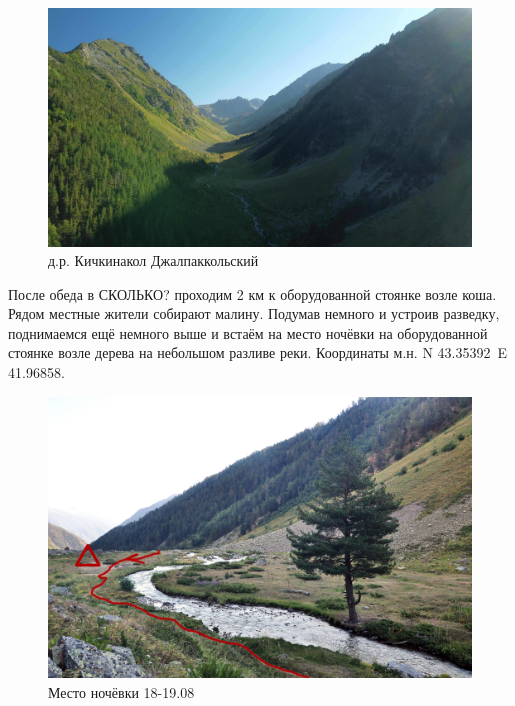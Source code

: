 \begin{figure}[h!]
	\centering
	\includegraphics[width=0.7\linewidth]{../pics/DJI_0805}
	\caption{д.р. Кичкинакол Джалпаккольский}
	\label{fig:kichkinakol}
\end{figure}

После обеда в \alert{СКОЛЬКО?} проходим 2 км к оборудованной стоянке возле коша. Рядом местные жители собирают малину. Подумав немного и устроив разведку, поднимаемся ещё немного выше и встаём на место ночёвки на оборудованной стоянке возле дерева на небольшом разливе реки. Координаты м.н. N 43.35392\degree~E 41.96858\degree.
\begin{figure}[h!]
	\centering
	\includegraphics[width=0.7\linewidth]{../pics/camp_18}
	\caption{Место ночёвки 18-19.08}
	\label{fig:camp_18}
\end{figure}


\newpage